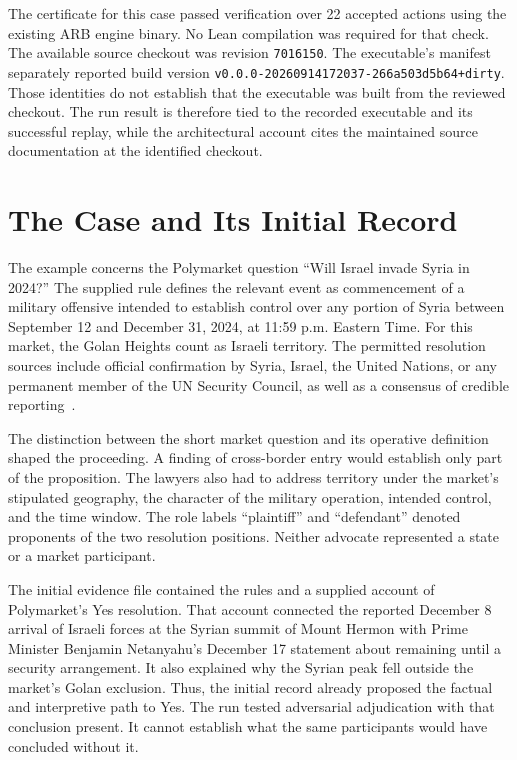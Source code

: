 \documentclass[11pt]{article}
\newcommand{\code}[1]{\texttt{#1}}
\begin{document}
The certificate for this case passed verification over 22 accepted actions using the existing ARB engine binary.  No Lean compilation was required for that check.  The available source checkout was revision \code{7016150}.  The executable's manifest separately reported build version \code{v0.0.0-20260914172037-266a503d5b64+dirty}.  Those identities do not establish that the executable was built from the reviewed checkout.  The run result is therefore tied to the recorded executable and its successful replay, while the architectural account cites the maintained source documentation at the identified checkout.

\section{The Case and Its Initial Record}
\label{sec:case}

The example concerns the Polymarket question ``Will Israel invade Syria in 2024?''  The supplied rule defines the relevant event as commencement of a military offensive intended to establish control over any portion of Syria between September 12 and December 31, 2024, at 11:59 p.m. Eastern Time.  For this market, the Golan Heights count as Israeli territory.  The permitted resolution sources include official confirmation by Syria, Israel, the United Nations, or any permanent member of the UN Security Council, as well as a consensus of credible reporting~\cite{example}.

The distinction between the short market question and its operative definition shaped the proceeding.  A finding of cross-border entry would establish only part of the proposition.  The lawyers also had to address territory under the market's stipulated geography, the character of the military operation, intended control, and the time window.  The role labels ``plaintiff'' and ``defendant'' denoted proponents of the two resolution positions.  Neither advocate represented a state or a market participant.

The initial evidence file contained the rules and a supplied account of Polymarket's Yes resolution.  That account connected the reported December 8 arrival of Israeli forces at the Syrian summit of Mount Hermon with Prime Minister Benjamin Netanyahu's December 17 statement about remaining until a security arrangement.  It also explained why the Syrian peak fell outside the market's Golan exclusion.  Thus, the initial record already proposed the factual and interpretive path to Yes.  The run tested adversarial adjudication with that conclusion present.  It cannot establish what the same participants would have concluded without it.
\end{document}
